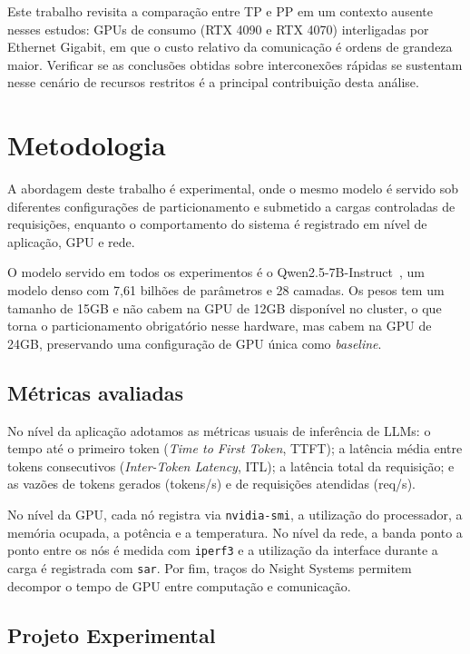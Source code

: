 \documentclass[manuscript,screen]{acmart}
\begin{document}
Este trabalho revisita a comparação entre TP e PP em um contexto ausente nesses estudos: GPUs de consumo (RTX 4090 e RTX 4070) interligadas por Ethernet Gigabit, em que o custo relativo da comunicação é ordens de grandeza maior. Verificar se as conclusões obtidas sobre interconexões rápidas se sustentam nesse cenário de recursos restritos é a principal contribuição desta análise.

\section{Metodologia}

A abordagem deste trabalho é experimental, onde o mesmo modelo é servido sob diferentes configurações de particionamento e submetido a cargas controladas de requisições, enquanto o comportamento do sistema é registrado em nível de aplicação, GPU e rede.

O modelo servido em todos os experimentos é o Qwen2.5-7B-Instruct~\cite{qwen2.5_7b_instruct}, um modelo denso com 7,61 bilhões de parâmetros e 28 camadas. Os pesos tem um tamanho de 15GB e não cabem na GPU de 12GB disponível no cluster, o que torna o particionamento obrigatório nesse hardware, mas cabem na GPU de 24GB, preservando uma configuração de GPU única como \textit{baseline}.

\subsection{Métricas avaliadas}
\label{sec:metricas}

No nível da aplicação adotamos as métricas usuais de inferência de LLMs: o tempo até o primeiro token (\textit{Time to First Token}, TTFT); a latência média entre tokens consecutivos (\textit{Inter-Token Latency}, ITL); a latência total da requisição; e as vazões de tokens gerados (tokens/s) e de requisições atendidas (req/s).

No nível da GPU, cada nó registra via \texttt{nvidia-smi}, a utilização do processador, a memória ocupada, a potência e a temperatura. No nível da rede, a banda ponto a ponto entre os nós é medida com \texttt{iperf3} e a utilização da interface durante a carga é registrada com \texttt{sar}. Por fim, traços do Nsight Systems permitem decompor o tempo de GPU entre computação e comunicação.

\subsection{Projeto Experimental}
\end{document}
